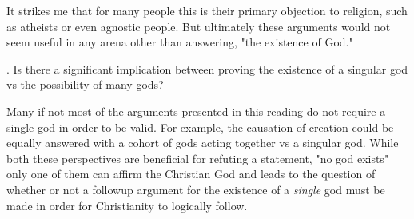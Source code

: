 \documentclass[12pt]{turabian-researchpaper}
\begin{document}
It strikes me that for many people this is their primary objection to religion, such as atheists or even agnostic people. But ultimately these arguments would not seem useful in any arena other than answering, "the existence of God."

. Is there a significant implication between proving the existence of a singular god vs the possibility of many gods?

Many if not most of the arguments presented in this reading do not require a single god in order to be valid. For example, the causation of creation could be equally answered with a cohort of gods acting together vs a singular god. While both these perspectives are beneficial for refuting a statement, "no god exists" only one of them can affirm the Christian God and leads to the question of whether or not a followup argument for the existence of a \textit{single} god must be made in order for Christianity to logically follow.

\newpage
\printbibliography
\end{document}
